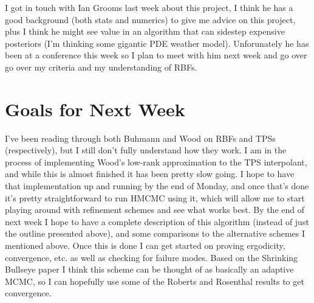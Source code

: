\documentclass[12pt,a4paper]{article}
\begin{document}
I got in touch with Ian Grooms last week about this project, I think he has a good background (both stats and numerics) to give me advice on this project, plus I think he might see value in an algorithm that can sidestep expensive posteriors (I'm thinking some gigantic PDE weather model).  Unforunately he has been at a conference this week so I plan to meet with him next week and go over  go over my criteria and my understanding of RBFs.

\section{Goals for Next Week}
I've been reading through both Buhmann and Wood on RBFs and TPSs (respectively), but I still don't fully understand how they work.  I am in the process of implementing Wood's low-rank approximation to the TPS interpolant, and while this is almost finished it has been pretty slow going.  I hope to have that implementation up and running by the end of Monday, and once that's done it's pretty straightforward to run HMCMC using it, which will allow me to start playing around with refinement schemes and see what works best.  By the end of next week I hope to have a complete description of this algorithm (instead of just the outline presented above), and some comparisons to the alternative schemes I mentioned above.  Once this is done I can get started on proving ergodicity, convergence, etc. as well as checking for failure modes.  Based on the Shrinking Bullseye paper I think this scheme can be thought of as basically an adaptive MCMC, so I can hopefully use some of the Roberts and Rosenthal \cite{roberts_coupling_2007} results to get convergence.



\printbibliography
\end{document}
